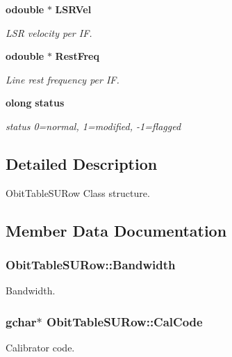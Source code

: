 \begin{CompactItemize}
{\bf odouble} $\ast$ {\bf LSRVel}
\begin{CompactList}\small\item\em LSR velocity per IF. \item\end{CompactList}\item 
{\bf odouble} $\ast$ {\bf Rest\-Freq}
\begin{CompactList}\small\item\em Line rest frequency per IF. \item\end{CompactList}\item 
{\bf olong} {\bf status}
\begin{CompactList}\small\item\em status 0=normal, 1=modified, -1=flagged \item\end{CompactList}\end{CompactItemize}


\subsection{Detailed Description}
Obit\-Table\-SURow Class structure. 



\subsection{Member Data Documentation}
\subsubsection{ {\bf Obit\-Table\-SURow::Bandwidth}}\label{structObitTableSURow_o8}


Bandwidth. 

\subsubsection{\setlength{\rightskip}{0pt plus 5cm}gchar$\ast$ {\bf Obit\-Table\-SURow::Cal\-Code}}\label{structObitTableSURow_o17}


Calibrator code. 

